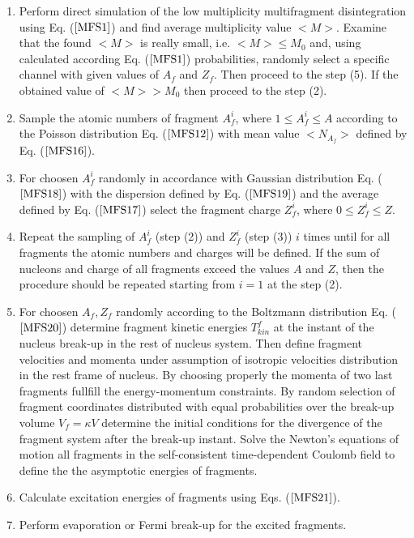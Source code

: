 \begin{enumerate}
\item Perform direct simulation of the 
 low multiplicity multifragment disintegration using Eq. ($\ref{MFS1}$)
 and find average multiplicity value $<M>$.  Examine that the found
 $<M>$ is really small, i.e.  $<M> \leq M_0$ and, using calculated
 according Eq. ($\ref{MFS1}$) probabilities, randomly select a specific
 channel with given values of $A_f$ and $Z_f$. Then proceed to the step
 (5).  If the obtained value of $<M> > M_0$ then proceed to the step
 (2).

\item Sample the atomic numbers of fragment $A^i_f$, where $1 \leq A^i_f
\leq A$ according to the Poisson distribution Eq. ($\ref{MFS12}$) with mean value
$<N_{A_f}>$ defined by Eq. ($\ref{MFS16}$).

\item For choosen $A^i_f$ randomly in accordance with 
Gaussian distribution Eq. ($\ref{MFS18}$) with the dispersion  defined by Eq. 
($\ref{MFS19}$) and the average defined 
by Eq. ($\ref{MFS17}$) select the fragment charge $Z^i_f$, 
where $0 \leq Z^i_f \leq Z$.

\item Repeat the sampling of $A^i_f$ 
(step (2)) and $Z^i_f$ (step (3)) $i$ times 
until 
for all fragments the atomic numbers and charges will be defined. If the 
sum of nucleons and charge of all fragments exceed the values $A$ and $Z$, 
 then the procedure should be repeated starting from $i = 1$ at the step (2).

\item For 
choosen $A_f, Z_f$ randomly according to the Boltzmann distribution 
Eq. ($\ref{MFS20}$) determine fragment kinetic energies $T^{f}_{kin}$ 
 at the instant of the nucleus break-up in the rest of nucleus system. 
Then define fragment velocities and momenta under assumption of 
isotropic 
velocities distribution in the rest frame of nucleus. 
By choosing properly the momenta of two last fragments
fullfill the energy-momentum constraints.
By random selection of fragment coordinates distributed with equal 
probabilities over the break-up volume $V_f = \kappa V$ determine 
the initial conditions for the divergence of the fragment system after 
the break-up instant. Solve the Newton's
equations of motion all fragments in the self-consistent
time-dependent Coulomb field to define the 
 the asymptotic energies of fragments.

\item Calculate excitation energies of fragments using Eqs. ($\ref{MFS21}$).

\item Perform evaporation or Fermi break-up for the excited fragments.

\end{enumerate}
